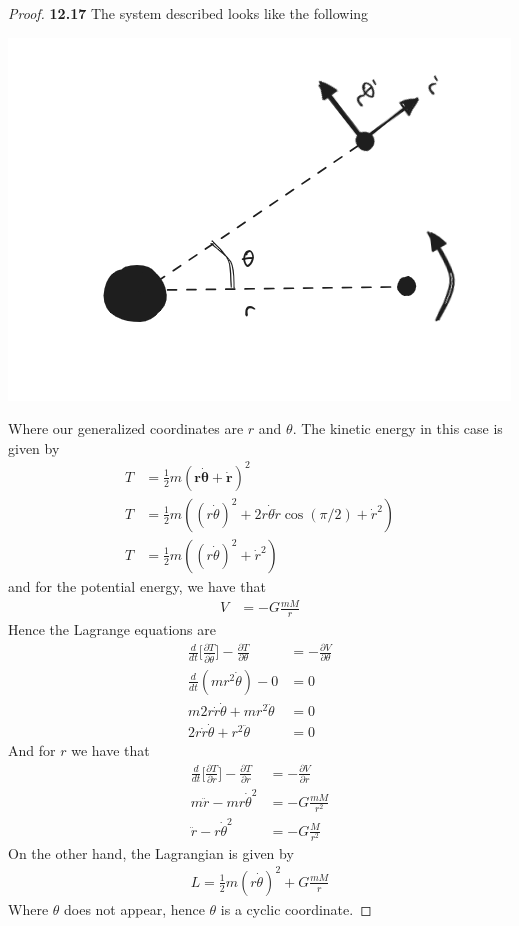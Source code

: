 \documentclass[11pt]{article}
\theoremstyle{definition}
\begin{document}
\begin{proof}{\textbf{12.17}}
    The system described looks like the following
    \begin{center}
        \includegraphics[scale=0.45]{ch12-17.png}
    \end{center}
    Where our generalized coordinates are $r$ and $\theta$.
    The kinetic energy in this case is given by
    \begin{align*}
        T &= \frac{1}{2}m(\bm{r\dot{\theta}} + \bm{\dot{r}})^2\\
        T &= \frac{1}{2}m((r\dot{\theta})^2 + 2r\dot{\theta}\dot{r}\cos(\pi/2) + \dot{r}^2)\\
        T &= \frac{1}{2}m((r\dot{\theta})^2 + \dot{r}^2)
    \end{align*}
    and for the potential energy, we have that 
    \begin{align*}
        V &= -G\frac{mM}{r}
    \end{align*}
    Hence the Lagrange equations are
    \begin{align*}
        \frac{d}{dt}\bigg[\frac{\partial T}{\partial \dot{\theta}}\bigg] - 
        \frac{\partial T}{\partial \theta}
        &= -\frac{\partial V}{\partial \theta}\\
        \frac{d}{dt}(mr^2\dot{\theta}) - 0 &= 0\\
        m2r\dot{r}\dot{\theta} + mr^2\ddot{\theta} &= 0\\
        2r\dot{r}\dot{\theta} + r^2\ddot{\theta} &= 0
    \end{align*}
    And for $r$ we have that
    \begin{align*}
        \frac{d}{dt}\bigg[\frac{\partial T}{\partial \dot{r}}\bigg] - 
        \frac{\partial T}{\partial r}
        &= -\frac{\partial V}{\partial r}\\
        m\ddot{r} - mr\dot\theta^2 &= -G\frac{mM}{r^2}\\
        \ddot{r} -r\dot\theta^2 &= -G\frac{M}{r^2}
    \end{align*}
    On the other hand, the Lagrangian is given by
    \begin{align*}
        L = \frac{1}{2}m(r\dot{\theta})^2 + G\frac{mM}{r}
    \end{align*}
    Where $\theta$ does not appear, hence $\theta$ is a cyclic coordinate.


\end{proof}
\end{document}
